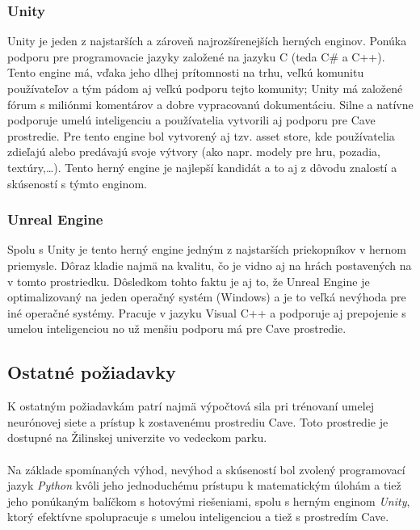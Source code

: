 \subsubsection{Unity}
Unity je jeden z najstarších a zároveň najrozšírenejších herných enginov.\cite{game_engine_unity}
Ponúka podporu pre programovacie jazyky založené na jazyku C (teda C\# a C++).
Tento engine má, vďaka jeho dlhej prítomnosti na trhu, veľkú komunitu používateľov a tým pádom aj veľkú podporu tejto
komunity;
Unity má založené fórum s miliónmi komentárov a dobre vypracovanú dokumentáciu.
Silne a natívne podporuje umelú inteligenciu\cite{game_engine_unity_ml_agents} a používatelia vytvorili aj podporu pre
Cave prostredie\cite{game_engine_unity_kave}.
Pre tento engine bol vytvorený aj tzv. asset store, kde používatelia zdieľajú alebo predávajú svoje výtvory (ako napr.
modely pre hru, pozadia, textúry,\dots).
Tento herný engine je najlepší kandidát a to aj z dôvodu znalostí a skúseností s týmto enginom.

\subsubsection{Unreal Engine}
Spolu s Unity je tento herný engine jedným z najstarších priekopníkov v hernom
priemysle.\cite{game_engine_unreal_engine}
Dôraz kladie najmä na kvalitu, čo je vidno aj na hrách postavených na v tomto prostriedku.
Dôsledkom tohto faktu je aj to, že Unreal Engine je optimalizovaný na jeden operačný systém (Windows) a je to veľká
nevýhoda pre iné operačné systémy.
Pracuje v jazyku Visual C++ a podporuje aj prepojenie s umelou inteligenciou no už menšiu podporu má pre Cave
prostredie.

\subsection{Ostatné požiadavky}\label{subsec:requirements-other}

K ostatným požiadavkám patrí najmä výpočtová sila pri trénovaní umelej neurónovej siete a prístup k zostavenému
prostrediu Cave.
Toto prostredie je dostupné na Žilinskej univerzite vo vedeckom parku.
\\
\\
Na základe spomínaných výhod, nevýhod a skúseností bol zvolený programovací jazyk \emph{Python} kvôli jeho jednoduchému
prístupu k matematickým úlohám a tiež jeho ponúkaným balíčkom s hotovými riešeniami, spolu s herným enginom
\emph{Unity}, ktorý efektívne spolupracuje s umelou inteligenciou a tiež s prostredím Cave.

